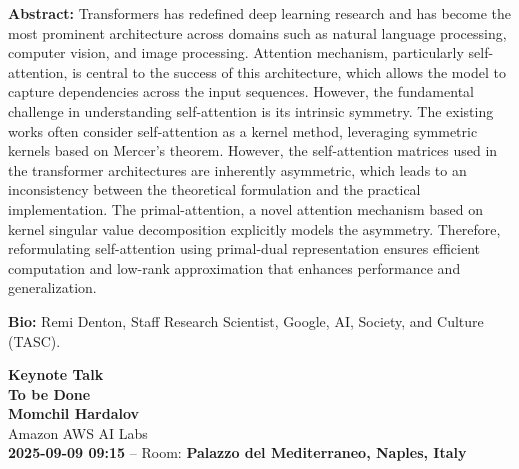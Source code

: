 \documentclass[11pt,oneside]{book}
\begin{document}
  \vspace*{0.2cm}
    \textbf{Abstract:} Transformers has redefined deep learning research and has become the most prominent architecture across domains such as natural language processing, computer vision, and image processing. Attention mechanism, particularly self-attention, is central to the success of this architecture, which allows the model to capture dependencies across the input sequences. However, the fundamental challenge in understanding self-attention is its intrinsic symmetry. The existing works often consider self-attention as a kernel method, leveraging symmetric kernels based on Mercer's theorem. However, the self-attention matrices used in the transformer architectures are inherently asymmetric, which leads to an inconsistency between the theoretical formulation and the practical implementation. The primal-attention, a novel attention mechanism based on kernel singular value decomposition explicitly models the asymmetry. Therefore, reformulating self-attention using primal-dual representation ensures efficient computation and low-rank approximation that enhances performance and generalization. 
\\
  \newline
  
    \textbf{Bio:} Remi Denton, Staff Research Scientist, Google, AI, Society, and Culture (TASC). 
  \newpage
  \begin{center}
          {\Large \textbf{Keynote Talk}\\}
      {\LARGE \textbf{To be Done}\\}
        \vspace*{0.5cm}
    \textbf{Momchil Hardalov}\\
        Amazon AWS AI Labs\\
        
        
        \textbf{2025-09-09 09:15} -- 
                Room: \textbf{Palazzo del Mediterraneo, Naples, Italy}\\
        
  \end{center}
\end{document}
